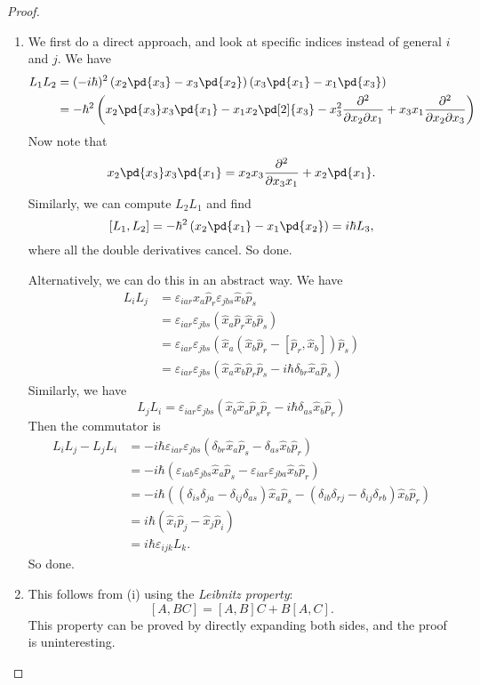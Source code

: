 \documentclass[a4paper]{article}
\begin{document}
\begin{proof}\leavevmode
  \begin{enumerate}
    \item We first do a direct approach, and look at specific indices instead of general $i$ and $j$. We have
      \begin{align*}
        L_1L_2 &= (-i\hbar)^2 \left(x_2 \pd{x_3} - x_3 \pd{x_2}\right)\left(x_3 \pd{x_1} - x_1 \pd{x_3}\right)\\
        &= -\hbar^2 \left(x_2 \pd{x_3} x_3 \pd{x_1} - x_1x_2 \pd[2]{x_3} - x_3^2\frac{\partial^2}{\partial x_2\partial x_1} + x_3 x_1 \frac{\partial^2}{\partial x_2 \partial x_3}\right)
      \end{align*}
      Now note that
      \[
        x_2 \pd{x_3} x_3 \pd{x_1} = x_2x_3 \frac{\partial^2}{\partial x_3x_1} + x_2 \pd{x_1}.
      \]
      Similarly, we can compute $L_2L_1$ and find
      \[
        [L_1, L_2] = -\hbar^2 \left(x_2 \pd{x_1} - x_1 \pd{x_2}\right) = i\hbar L_3,
      \]
      where all the double derivatives cancel. So done.

      Alternatively, we can do this in an abstract way. We have
      \begin{align*}
        L_i L_j &= \varepsilon_{iar} \hat{x}_a \hat{p}_r \varepsilon_{jbs} \hat{x}_b \hat{p}_s\\
        &= \varepsilon_{iar} \varepsilon_{jbs} (\hat{x}_a \hat{p}_r \hat{x}_b \hat{p}_s)\\
        &= \varepsilon_{iar} \varepsilon_{jbs} (\hat{x}_a (\hat{x}_b \hat{p}_r - [\hat{p}_r, \hat{x}_b]) \hat{p}_s)\\
        &= \varepsilon_{iar} \varepsilon_{jbs} (\hat{x}_a \hat{x}_b \hat{p}_r \hat{p}_s - i\hbar \delta_{br} \hat{x}_a \hat{p}_s)
      \end{align*}
      Similarly, we have
      \[
        L_j L_i = \varepsilon_{iar} \varepsilon_{jbs} (\hat{x}_b \hat{x}_a \hat{p}_s \hat{p}_r - i\hbar \delta_{as} \hat{x}_b \hat{p}_r)
      \]
      Then the commutator is
      \begin{align*}
        L_i L_j - L_j L_i &= -i\hbar \varepsilon_{iar} \varepsilon_{jbs}(\delta_{br} \hat{x}_a \hat{p}_s - \delta_{as}\hat{x}_b \hat{p}_r)\\
        &= -i\hbar (\varepsilon_{iab} \varepsilon_{jbs} \hat{x}_a \hat{p}_s - \varepsilon_{iar} \varepsilon_{jba} \hat{x}_b\hat{p}_r)\\
        &= -i\hbar ((\delta_{is} \delta_{ja} - \delta_{ij} \delta_{as})\hat{x}_a \hat{p}_s - (\delta_{ib} \delta_{rj} - \delta_{ij}\delta_{rb}) \hat{x}_b \hat{p}_r)\\
        &= i\hbar (\hat{x}_i \hat{p}_j - \hat{x}_j \hat{p}_i)\\
        &= i\hbar \varepsilon_{ijk} L_k.
      \end{align*}
      So done.
    \item This follows from (i) using the \emph{Leibnitz property}:
      \[
        [A, BC] = [A, B] C + B[A, C].
      \]
      This property can be proved by directly expanding both sides, and the proof is uninteresting.


\end{enumerate}
\end{proof}
\end{document}

